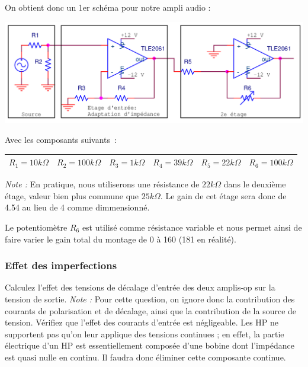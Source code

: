 \documentclass{../template/labo}
\begin{document}
On obtient donc un 1er schéma pour notre ampli audio :
\begin{center}
\includegraphics[width=14cm]{figures/AOP2etages.png}
\end{center}
Avec les composants suivants~:
\begin{center}
\begin{tabular}{|c||c||c||c||c||c|}\hline
$R_1 = 10 k\Omega$ & $R_2 = 100 k\Omega$ & $R_3 = 1 k\Omega$ & $R_4 = 39 k\Omega$ & $R_5 = 22 k\Omega$ & $R_6 = 100 k\Omega$ \\ \hline
\end{tabular}
\end{center}

\textit{Note :} En pratique, nous utiliserons une résistance de $22 k\Omega$ dans le deuxième étage, valeur bien plus commune que $25 k\Omega$. Le gain de cet étage sera donc de 4.54 au lieu de 4 comme dimmensionné.

Le potentiomètre $R_6$ est utilisé comme résistance variable et nous permet ainsi de faire varier le gain total du montage de 0 à 160 (181 en réalité).

\subsubsection{Effet des imperfections}

\Question
{
Calculez l'effet des tensions de décalage d'entrée des deux amplis-op sur la tension de sortie.
\textit{Note :} Pour cette question, on ignore donc la contribution des courants de polarisation et de décalage, ainsi que la contribution de la source de tension.
}
{}
\Question
{
Vérifiez que l'effet des courants d'entrée est négligeable.
}
{}
Les HP ne supportent pas qu'on leur applique des tensions continues ; en effet, la partie électrique d'un HP est essentiellement composée d'une bobine dont l'impédance est quasi nulle en continu. Il faudra donc éliminer cette composante continue.
\end{document}
